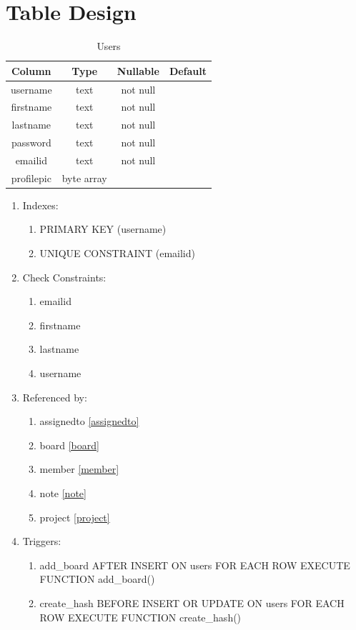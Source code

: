\documentclass[conference]{IEEEtran}
\begin{document}
\section{Table Design}
\begin{table}[htbp]
  \caption{Users}
  \begin{center}
    \begin{tabular}{|c|c|c|c|}
      \hline
      \textbf{Column} & \textbf{Type} & \textbf{Nullable} & \textbf{Default}\\
      \hline
      username & text & not null & \\
      firstname & text & not null & \\
      lastname & text & not null & \\
      password & text & not null & \\
      emailid & text & not null & \\
      profilepic & byte array & & \\
      \hline
    \end{tabular}
    \begin{enumerate}
    \item Indexes:
      \begin{enumerate}
      \item PRIMARY KEY (username)
      \item UNIQUE CONSTRAINT (emailid)
      \end{enumerate}
    \item Check Constraints:
      \begin{enumerate}
      \item emailid
      \item firstname
      \item lastname
      \item username
      \end{enumerate}
    \item Referenced by:
      \begin{enumerate}
      \item assignedto \ref{assignedto}
      \item board \ref{board}
      \item member \ref{member}
      \item note \ref{note}
      \item project \ref{project}
      \end{enumerate}
    \item Triggers:
      \begin{enumerate}
      \item add\_board AFTER INSERT ON users FOR EACH ROW EXECUTE FUNCTION add\_board()
      \item create\_hash BEFORE INSERT OR UPDATE ON users FOR EACH ROW EXECUTE FUNCTION create\_hash()
      \end{enumerate}
    \end{enumerate}
    \label{users}
  \end{center}
\end{table}
\end{document}
